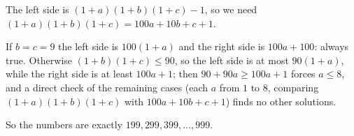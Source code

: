 The left side is $(1+a)(1+b)(1+c)-1$, so we need $(1+a)(1+b)(1+c)=100a+10b+c+1$.

If $b=c=9$ the left side is $100(1+a)$ and the right side is $100a+100$: always true. Otherwise $(1+b)(1+c)\le90$, so the left side is at most $90(1+a)$, while the right side is at least $100a+1$; then $90+90a\ge100a+1$ forces $a\le8$, and a direct check of the remaining cases (each $a$ from $1$ to $8$, comparing $(1+a)(1+b)(1+c)$ with $100a+10b+c+1$) finds no other solutions.

So the numbers are exactly $\boxed{199,299,399,\dots,999}$.
